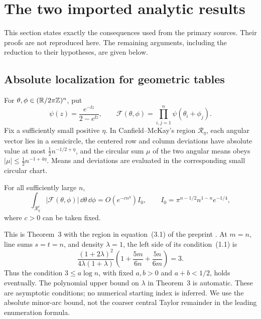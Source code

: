 \section{The two imported analytic results}\label{sqt:sec:imports}
This section states exactly the consequences used from the primary sources. Their proofs are not reproduced here. The remaining arguments, including the reduction to their hypotheses, are given below.

\subsection{Absolute localization for geometric tables}
For $\theta,\phi\in(\mathbb R/2\pi\mathbb Z)^n$, put
\begin{equation}\label{sqt:eq:integrand}
\psi(z)=\frac{e^{-\ii z}}{2-e^{\ii z}},\qquad
\mathcal F(\theta,\phi)=\prod_{i,j=1}^n\psi(\theta_i+\phi_j).
\end{equation}
Fix a sufficiently small positive $\eta$. In Canfield--McKay's region $\mathcal R_\eta$, each angular vector lies in a semicircle, the centered row and column deviations have absolute value at most $\tfrac12n^{-1/2+\eta}$, and the circular sum $\mu$ of the two angular means obeys $|\mu|\leq\tfrac12n^{-1+4\eta}$. Means and deviations are evaluated in the corresponding small circular chart.

\begin{proposition}\label{sqt:prop:minor}
For all sufficiently large $n$,
\begin{equation}\label{sqt:eq:minor}
\int_{\mathcal R_\eta^c}|\mathcal F(\theta,\phi)|\,\dd\theta\,\dd\phi
 =O(e^{-c n^\eta})I_0,
\qquad I_0=\pi^{n-1/2}n^{1-n}e^{-1/4},
\end{equation}
where $c>0$ can be taken fixed.
\end{proposition}
This is Theorem~3 with the region in equation~(3.1) of the preprint \cite{CM}. At $m=n$, line sums $s=t=n$, and density $\lambda=1$, the left side of its condition~(1.1) is
\[
\frac{(1+2\lambda)^2}{4\lambda(1+\lambda)}
\left(1+\frac{5m}{6n}+\frac{5n}{6m}\right)=3.
\]
Thus the condition $3\leq a\log n$, with fixed $a,b>0$ and $a+b<1/2$, holds eventually. The polynomial upper bound on $\lambda$ in Theorem~3 is automatic. These are asymptotic conditions; no numerical starting index is inferred. We use the absolute minor-arc bound, not the coarser central Taylor remainder in the leading enumeration formula.

